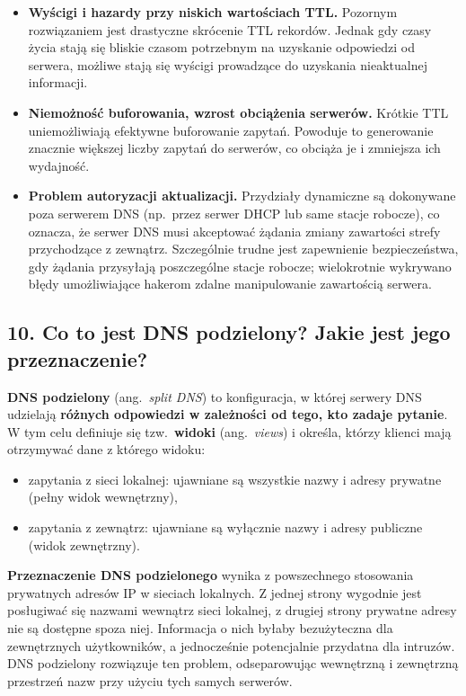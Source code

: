 \documentclass[12pt,a4paper]{article}
\begin{document}
\begin{itemize}
  \item \textbf{Wyścigi i hazardy przy niskich wartościach TTL.}
        Pozornym rozwiązaniem jest drastyczne skrócenie TTL rekordów. Jednak gdy
        czasy życia stają się bliskie czasom potrzebnym na uzyskanie odpowiedzi od
        serwera, możliwe stają się wyścigi prowadzące do uzyskania nieaktualnej
        informacji.
  \item \textbf{Niemożność buforowania, wzrost obciążenia serwerów.}
        Krótkie TTL uniemożliwiają efektywne buforowanie zapytań. Powoduje to
        generowanie znacznie większej liczby zapytań do serwerów, co obciąża je
        i zmniejsza ich wydajność.
  \item \textbf{Problem autoryzacji aktualizacji.}
        Przydziały dynamiczne są dokonywane poza serwerem DNS (np.\ przez serwer
        DHCP lub same stacje robocze), co oznacza, że serwer DNS musi akceptować
        żądania zmiany zawartości strefy przychodzące z zewnątrz. Szczególnie
        trudne jest zapewnienie bezpieczeństwa, gdy żądania przysyłają poszczególne
        stacje robocze; wielokrotnie wykrywano błędy umożliwiające hakerom zdalne
        manipulowanie zawartością serwera.
\end{itemize}

\subsection*{10. Co to jest DNS podzielony? Jakie jest jego przeznaczenie?}

\textbf{DNS podzielony} (ang.\ \emph{split DNS}) to konfiguracja, w której serwery
DNS udzielają \textbf{różnych odpowiedzi w zależności od tego, kto zadaje pytanie}.
W tym celu definiuje się tzw.\ \textbf{widoki} (ang.\ \emph{views}) i określa,
którzy klienci mają otrzymywać dane z którego widoku:

\begin{itemize}
  \item zapytania z sieci lokalnej: ujawniane są wszystkie nazwy i adresy
        prywatne (pełny widok wewnętrzny),
  \item zapytania z zewnątrz: ujawniane są wyłącznie nazwy i adresy publiczne
        (widok zewnętrzny).
\end{itemize}

\textbf{Przeznaczenie DNS podzielonego} wynika z powszechnego stosowania prywatnych
adresów IP w sieciach lokalnych. Z jednej strony wygodnie jest posługiwać się
nazwami wewnątrz sieci lokalnej, z drugiej strony prywatne adresy nie są dostępne
spoza niej. Informacja o nich byłaby bezużyteczna dla zewnętrznych użytkowników,
a jednocześnie potencjalnie przydatna dla intruzów. DNS podzielony rozwiązuje
ten problem, odseparowując wewnętrzną i zewnętrzną przestrzeń nazw przy użyciu
tych samych serwerów.
\end{document}
